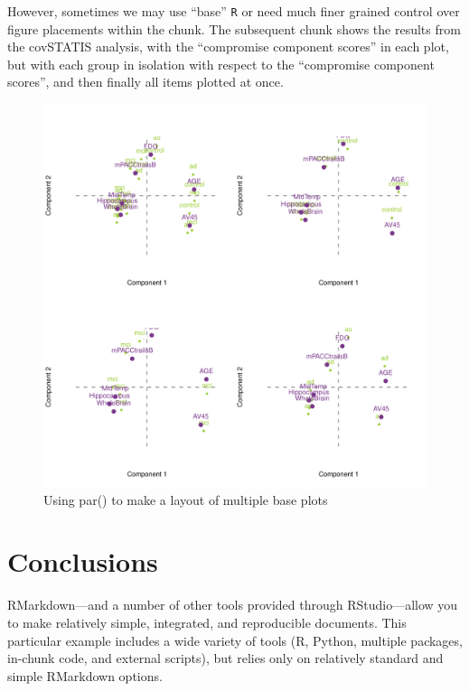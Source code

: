 \documentclass[]{article}
\begin{document}
However, sometimes we may use ``base'' \texttt{R} or need much finer
grained control over figure placements within the chunk. The subsequent
chunk shows the results from the covSTATIS analysis, with the
``compromise component scores'' in each plot, but with each group in
isolation with respect to the ``compromise component scores'', and then
finally all items plotted at once.

\begin{figure}[H]

{\centering \includegraphics{1_a_Simple_RMarkdown_PDF_files/figure-latex/unnamed-chunk-3-1} 

}

\caption{Using par() to make a layout of multiple base plots}\label{fig:unnamed-chunk-3}
\end{figure}

\hypertarget{conclusions}{%
\section{Conclusions}\label{conclusions}}

RMarkdown---and a number of other tools provided through RStudio---allow
you to make relatively simple, integrated, and reproducible documents.
This particular example includes a wide variety of tools (R, Python,
multiple packages, in-chunk code, and external scripts), but relies only
on relatively standard and simple RMarkdown options.
\end{document}
